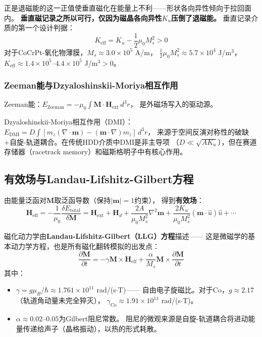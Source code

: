 \documentclass[11pt,a4paper,openany]{book}
\theoremstyle{definition}
\theoremstyle{plain}
\theoremstyle{remark}
\begin{document}
正是退磁能的这一正值使垂直磁化在能量上不利——形状各向异性倾向于拉回面内。
\textbf{垂直磁记录之所以可行，仅因为磁晶各向异性$K_u$压倒了退磁能。}
垂直记录介质的第一个设计判据：
\begin{equation}\label{eq:keff}
  K_{\text{eff}} = K_u - \frac{1}{2}\mu_0 M_s^2 > 0
\end{equation}
对于CoCrPt-氧化物薄膜，$M_s \approx 3.0 \times 10^5$ A/m，
$\frac{1}{2}\mu_0 M_s^2 \approx 5.7 \times 10^4$ J/m$^3$，
$K_{\text{eff}} \approx 1.4 \times 10^5$--$4.4 \times 10^5$ J/m$^3 > 0$。

\subsubsection{Zeeman能与Dzyaloshinskii-Moriya相互作用}

Zeeman能：$E_{\text{Zeeman}} = -\mu_0\int \mathbf{M}\cdot\mathbf{H}_{\text{ext}}\,d^3r$，
是外磁场写入的驱动源。

Dzyaloshinskii-Moriya相互作用（DMI）：
$E_{\text{DMI}} = D\int [m_z(\nabla\cdot\mathbf{m}) - (\mathbf{m}\cdot\nabla)m_z]\,d^3r$，
来源于空间反演对称性的破缺+自旋-轨道耦合。在传统HDD介质中DMI是非主导项
（$D \ll \sqrt{AK_u}$），但在赛道存储器（racetrack memory）和磁斯格明子中有核心作用。

\subsection{有效场与Landau-Lifshitz-Gilbert方程}

由能量泛函对$\mathbf{M}$取泛函导数（保持$|\mathbf{m}| = 1$约束），
得到\textbf{有效场}：
\begin{equation}
  \mathbf{H}_{\text{eff}} = -\frac{1}{\mu_0}\frac{\delta E_{\text{total}}}{\delta\mathbf{M}}
  = \mathbf{H}_{\text{ext}} + \mathbf{H}_d + \frac{2A}{\mu_0 M_s^2}\nabla^2\mathbf{m}
  + \frac{2K_u}{\mu_0 M_s^2}(\mathbf{m}\cdot\hat{u})\hat{u} + \cdots
\end{equation}

磁化动力学由\textbf{Landau-Lifshitz-Gilbert（LLG）方程}描述——
这是微磁学的基本动力学方程，也是所有磁化翻转模拟的出发点：
\begin{equation}\label{eq:llg}
  \boxed{
  \frac{\partial\mathbf{M}}{\partial t}
  = -\gamma\mathbf{M}\times\mathbf{H}_{\text{eff}}
  + \frac{\alpha}{M_s}\mathbf{M}\times\frac{\partial\mathbf{M}}{\partial t}
  }
\end{equation}
其中：
\begin{itemize}
  \item $\gamma = g\mu_B/\hbar \approx 1.761 \times 10^{11}$ rad/(s$\cdot$T)——
  自由电子旋磁比。对于Co，$g \approx 2.17$（轨道角动量未完全猝灭），
  $\gamma_{\text{Co}} \approx 1.91 \times 10^{11}$ rad/(s$\cdot$T)。
  \item $\alpha \approx 0.02$--$0.05$为Gilbert阻尼常数。
  阻尼的微观来源是自旋-轨道耦合将进动能量传递给声子（晶格振动），以热的形式耗散。
\end{itemize}
\end{document}
